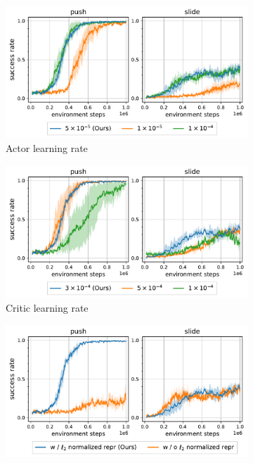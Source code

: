 \documentclass{article} %
\begin{document}
\begin{figure}[t]
    \centering
    \begin{subfigure}[c]{0.49\textwidth}
        \centering
        \includegraphics[width=\linewidth]{figures/hyperparam_ablation/actor_learning_rate.pdf}
        \caption{Actor learning rate}
    \end{subfigure}
    \hfill
    \begin{subfigure}[c]{0.49\textwidth}
        \centering
        \includegraphics[width=\linewidth]{figures/hyperparam_ablation/critic_learning_rate.pdf}
        \caption{Critic learning rate}
    \end{subfigure}
    \vfill
    \begin{subfigure}[c]{0.49\textwidth}
        \centering
        \includegraphics[width=\linewidth]{figures/hyperparam_ablation/representation_normalization.pdf}

\end{subfigure}
\end{figure}
\end{document}
